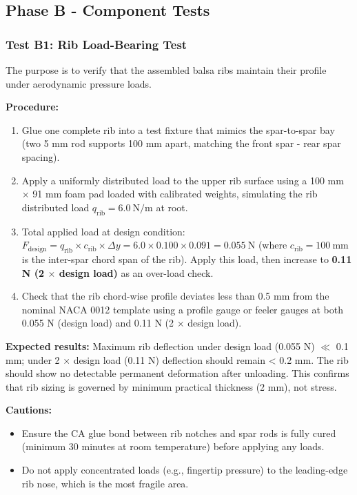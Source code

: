 \documentclass[10pt,a4paper]{article}
\begin{document}
\subsection{Phase B - Component Tests}

\subsubsection{Test B1: Rib Load-Bearing Test}

The purpose is to verify that the assembled balsa ribs maintain their profile under aerodynamic pressure loads.

\textbf{Procedure:}
\begin{enumerate}[noitemsep,topsep=2pt]
\item Glue one complete rib into a test fixture that mimics the spar-to-spar bay (two 5 mm rod supports 100 mm apart, matching the front spar - rear spar spacing).
\item Apply a uniformly distributed load to the upper rib surface using a 100 mm ${\times}$ 91 mm foam pad loaded with calibrated weights, simulating the rib distributed load $q_\text{rib} = 6.0\ \text{N/m}$ at root.
\item Total applied load at design condition: $F_{\text{design}} = q_\text{rib} \times c_{\text{rib}} \times \Delta y = 6.0 \times 0.100 \times 0.091 = 0.055\ \text{N}$ (where $c_{\text{rib}} = 100\ \text{mm}$ is the inter-spar chord span of the rib). Apply this load, then increase to \textbf{0.11 N (2 ${\times}$ design load)} as an over-load check.
\item Check that the rib chord-wise profile deviates less than 0.5 mm from the nominal NACA 0012 template using a profile gauge or feeler gauges at both 0.055 N (design load) and 0.11 N (2 ${\times}$ design load).
\end{enumerate}

\textbf{Expected results:} Maximum rib deflection under design load (0.055 N) $\ll$ 0.1 mm; under 2 ${\times}$ design load (0.11 N) deflection should remain < 0.2 mm. The rib should show no detectable permanent deformation after unloading. This confirms that rib sizing is governed by minimum practical thickness (2 mm), not stress.

\textbf{Cautions:}
\begin{itemize}[noitemsep,topsep=2pt]
\item Ensure the CA glue bond between rib notches and spar rods is fully cured (minimum 30 minutes at room temperature) before applying any loads.
\item Do not apply concentrated loads (e.g., fingertip pressure) to the leading-edge rib nose, which is the most fragile area.
\end{itemize}
\end{document}
